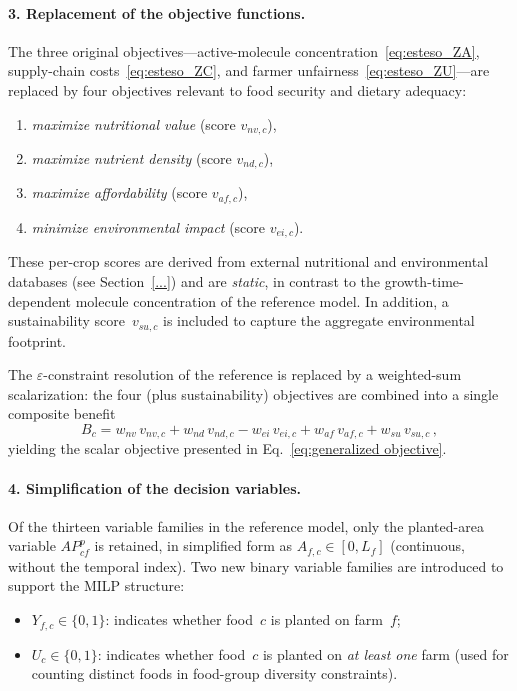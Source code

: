 \documentclass{oqireport}
\begin{document}
\paragraph{3. Replacement of the objective functions.}
The three original objectives---active-molecule concentration~\eqref{eq:esteso_ZA}, supply-chain costs~\eqref{eq:esteso_ZC}, and farmer unfairness~\eqref{eq:esteso_ZU}---are replaced by four objectives relevant to food security and dietary adequacy:
\begin{enumerate}
    \item \emph{maximize nutritional value} (score $v_{nv,c}$),
    \item \emph{maximize nutrient density} (score $v_{nd,c}$),
    \item \emph{maximize affordability} (score $v_{af,c}$),
    \item \emph{minimize environmental impact} (score $v_{ei,c}$).
\end{enumerate}
These per-crop scores are derived from external nutritional and environmental databases (see Section~\ref{...}) and are \emph{static}, in contrast to the growth-time-dependent molecule concentration of the reference model. In addition, a sustainability score~$v_{su,c}$ is included to capture the aggregate environmental footprint.

The $\varepsilon$-constraint resolution of the reference is replaced by a weighted-sum scalarization: the four (plus sustainability) objectives are combined into a single composite benefit
\begin{equation}
    B_c = w_{nv}\,v_{nv,c} + w_{nd}\,v_{nd,c} - w_{ei}\,v_{ei,c} + w_{af}\,v_{af,c} + w_{su}\,v_{su,c}\,,
    \label{eq:composite_benefit}
\end{equation}
yielding the scalar objective presented in Eq.~\eqref{eq:generalized objective}.

\paragraph{4. Simplification of the decision variables.}
Of the thirteen variable families in the reference model, only the planted-area variable $AP^{p}_{cf}$ is retained, in simplified form as $A_{f,c} \in [0, L_f]$ (continuous, without the temporal index). Two new binary variable families are introduced to support the MILP structure:
\begin{itemize}
    \item $Y_{f,c} \in \{0,1\}$: indicates whether food~$c$ is planted on farm~$f$;
    \item $U_c \in \{0,1\}$: indicates whether food~$c$ is planted on \emph{at least one} farm (used for counting distinct foods in food-group diversity constraints).
\end{itemize}
\end{document}

